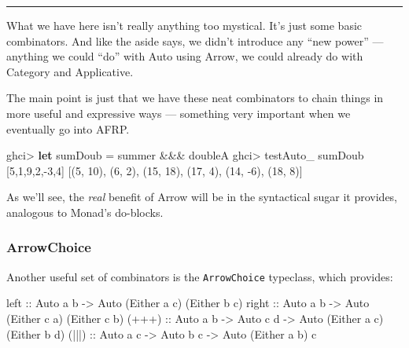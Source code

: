 \documentclass[]{article}
\newenvironment{Shaded}{}{}
\newcommand{\KeywordTok}[1]{\textcolor[rgb]{0.00,0.44,0.13}{\textbf{{#1}}}}
\newcommand{\DataTypeTok}[1]{\textcolor[rgb]{0.56,0.13,0.00}{{#1}}}
\newcommand{\DecValTok}[1]{\textcolor[rgb]{0.25,0.63,0.44}{{#1}}}
\newcommand{\OtherTok}[1]{\textcolor[rgb]{0.00,0.44,0.13}{{#1}}}
\newcommand{\FunctionTok}[1]{\textcolor[rgb]{0.02,0.16,0.49}{{#1}}}
\newcommand{\NormalTok}[1]{{#1}}
\begin{document}
\begin{center}\rule{0.5\linewidth}{\linethickness}\end{center}

What we have here isn't really anything too mystical. It's just some
basic combinators. And like the aside says, we didn't introduce any
``new power'' --- anything we could ``do'' with Auto using Arrow, we
could already do with Category and Applicative.

The main point is just that we have these neat combinators to chain
things in more useful and expressive ways --- something very important
when we eventually go into AFRP.

\begin{Shaded}
\begin{Highlighting}[]
\NormalTok{ghci}\FunctionTok{>} \KeywordTok{let} \NormalTok{sumDoub }\FunctionTok{=} \NormalTok{summer }\FunctionTok{&&&} \NormalTok{doubleA}
\NormalTok{ghci}\FunctionTok{>} \NormalTok{testAuto_ sumDoub [}\DecValTok{5}\NormalTok{,}\DecValTok{1}\NormalTok{,}\DecValTok{9}\NormalTok{,}\DecValTok{2}\NormalTok{,}\FunctionTok{-}\DecValTok{3}\NormalTok{,}\DecValTok{4}\NormalTok{]}
\NormalTok{[(}\DecValTok{5}\NormalTok{, }\DecValTok{10}\NormalTok{), (}\DecValTok{6}\NormalTok{, }\DecValTok{2}\NormalTok{), (}\DecValTok{15}\NormalTok{, }\DecValTok{18}\NormalTok{), (}\DecValTok{17}\NormalTok{, }\DecValTok{4}\NormalTok{), (}\DecValTok{14}\NormalTok{, }\FunctionTok{-}\DecValTok{6}\NormalTok{), (}\DecValTok{18}\NormalTok{, }\DecValTok{8}\NormalTok{)]}
\end{Highlighting}
\end{Shaded}

As we'll see, the \emph{real} benefit of Arrow will be in the
syntactical sugar it provides, analogous to Monad's do-blocks.

\subsubsection{ArrowChoice}\label{arrowchoice}

Another useful set of combinators is the \texttt{ArrowChoice} typeclass,
which provides:

\begin{Shaded}
\begin{Highlighting}[]
\OtherTok{left  ::} \DataTypeTok{Auto} \NormalTok{a b }\OtherTok{->} \DataTypeTok{Auto} \NormalTok{(}\DataTypeTok{Either} \NormalTok{a c) (}\DataTypeTok{Either} \NormalTok{b c)}
\OtherTok{right ::} \DataTypeTok{Auto} \NormalTok{a b }\OtherTok{->} \DataTypeTok{Auto} \NormalTok{(}\DataTypeTok{Either} \NormalTok{c a) (}\DataTypeTok{Either} \NormalTok{c b)}
\OtherTok{(+++) ::} \DataTypeTok{Auto} \NormalTok{a b }\OtherTok{->} \DataTypeTok{Auto} \NormalTok{c d }\OtherTok{->} \DataTypeTok{Auto} \NormalTok{(}\DataTypeTok{Either} \NormalTok{a c) (}\DataTypeTok{Either} \NormalTok{b d)}
\OtherTok{(|||) ::} \DataTypeTok{Auto} \NormalTok{a c }\OtherTok{->} \DataTypeTok{Auto} \NormalTok{b c }\OtherTok{->} \DataTypeTok{Auto} \NormalTok{(}\DataTypeTok{Either} \NormalTok{a b) c}
\end{Highlighting}
\end{Shaded}
\end{document}
